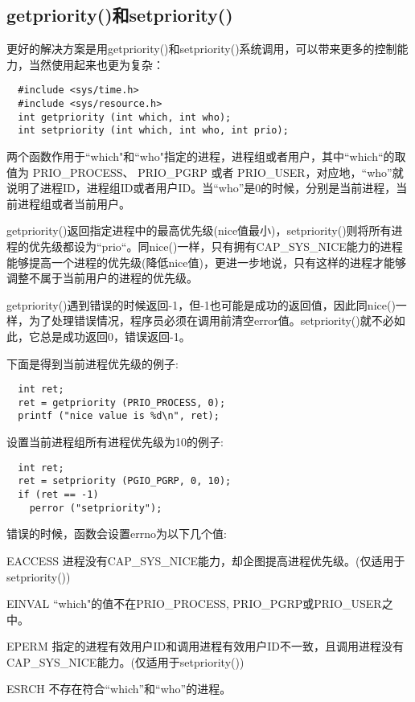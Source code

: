 \subsection{getpriority()和setpriority()}

更好的解决方案是用getpriority()和setpriority()系统调用，可以带来更多的控制能力，当然使用起来也更为复杂：

\begin{lstlisting}
  #include <sys/time.h>
  #include <sys/resource.h>
  int getpriority (int which, int who);
  int setpriority (int which, int who, int prio);
\end{lstlisting}

两个函数作用于``which"和``who"指定的进程，进程组或者用户，其中“which“的取值为 PRIO\_PROCESS、 PRIO\_PGRP 或者 PRIO\_USER，对应地，“who”就说明了进程ID，进程组ID或者用户ID。当“who”是0的时候，分别是当前进程，当前进程组或者当前用户。

getpriority()返回指定进程中的最高优先级(nice值最小)，setpriority()则将所有进程的优先级都设为“prio“。同nice()一样，只有拥有CAP\_SYS\_NICE能力的进程能够提高一个进程的优先级(降低nice值)，更进一步地说，只有这样的进程才能够调整不属于当前用户的进程的优先级。

getpriority()遇到错误的时候返回-1，但-1也可能是成功的返回值，因此同nice()一样，为了处理错误情况，程序员必须在调用前清空error值。setpriority()就不必如此，它总是成功返回0，错误返回-1。

下面是得到当前进程优先级的例子:

\begin{lstlisting}
  int ret;
  ret = getpriority (PRIO_PROCESS, 0);
  printf ("nice value is %d\n", ret);
\end{lstlisting}

设置当前进程组所有进程优先级为10的例子:

\begin{lstlisting}
  int ret;
  ret = setpriority (PGIO_PGRP, 0, 10);
  if (ret == -1)
    perror ("setpriority");
\end{lstlisting}

错误的时候，函数会设置errno为以下几个值:

\begin{eqlist*}
\item[EACCESS] 进程没有CAP\_SYS\_NICE能力，却企图提高进程优先级。(仅适用于setpriority())
\item[EINVAL] ``which"的值不在PRIO\_PROCESS, PRIO\_PGRP或PRIO\_USER之中。
\item[EPERM] 指定的进程有效用户ID和调用进程有效用户ID不一致，且调用进程没有CAP\_SYS\_NICE能力。(仅适用于setpriority())
\item[ESRCH] 不存在符合“which”和“who”的进程。
\end{eqlist*}

